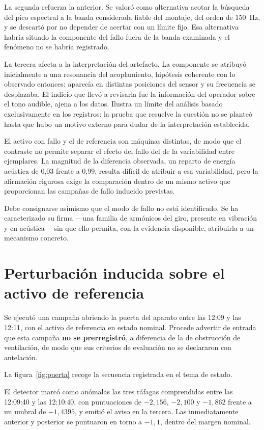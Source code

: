 La segunda refuerza la anterior. Se valoró como alternativa acotar la búsqueda del pico
espectral a la banda considerada fiable del montaje, del orden de \mbox{150 Hz}, y se
descartó por no depender de acertar con un límite fijo. Esa alternativa habría situado la
componente del fallo fuera de la banda examinada y el fenómeno no se habría registrado.

La tercera afecta a la interpretación del artefacto. La componente se atribuyó inicialmente a
una resonancia del acoplamiento, hipótesis coherente con lo observado entonces: aparecía en
distintas posiciones del sensor y su frecuencia se desplazaba. El indicio que llevó a revisarla
fue la información del operador sobre el tono audible, ajena a los datos. Ilustra un límite del
análisis basado exclusivamente en los registros: la prueba que resuelve la cuestión no se
planteó hasta que hubo un motivo externo para dudar de la interpretación establecida.

El activo con fallo y el de referencia son máquinas distintas, de modo que el contraste no
permite separar el efecto del fallo del de la variabilidad entre ejemplares. La magnitud de la
diferencia observada, un reparto de energía acústica de 0,03 frente a 0,99, resulta difícil de
atribuir a esa variabilidad, pero la afirmación rigurosa exige la comparación dentro de un
mismo activo que proporcionan las campañas de fallo inducido previstas.

Debe consignarse asimismo que el modo de fallo no está identificado. Se ha caracterizado su
firma —una familia de armónicos del giro, presente en vibración y en acústica— sin que ello
permita, con la evidencia disponible, atribuirla a un mecanismo concreto.

\section{Perturbación inducida sobre el activo de referencia}

Se ejecutó una campaña abriendo la puerta del aparato entre las \mbox{12:09} y las
\mbox{12:11}, con el activo de referencia en estado nominal. Procede advertir de entrada que
esta campaña \textbf{no se prerregistró}, a diferencia de la de obstrucción de ventilación, de
modo que sus criterios de evaluación no se declararon con antelación.

La figura~\ref{fig:puerta} recoge la secuencia registrada en el tema de estado.

El detector marcó como anómalas las tres ráfagas comprendidas entre las \mbox{12:09:40} y las
\mbox{12:10:40}, con puntuaciones de $-2{,}156$, $-2{,}100$ y $-1{,}862$ frente a un umbral de
$-1{,}4395$, y emitió el aviso en la tercera. Las inmediatamente anterior y posterior se
puntuaron en torno a $-1{,}1$, dentro del margen nominal.

